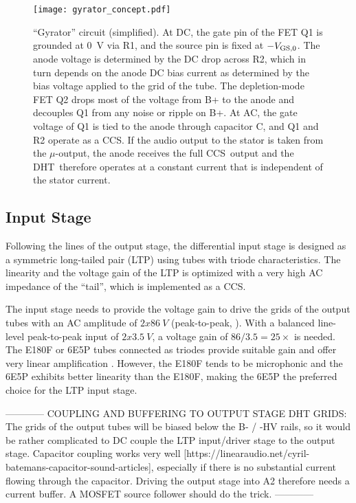 \begin{figure}
\begin{center}
\texttt{[image: gyrator\_concept.pdf]}
\caption{``Gyrator'' circuit (simplified). At DC, the gate pin of the FET Q1 is grounded at \SI{0}{V} via R1, and the source pin is fixed at $-V_{\rm GS,0}$. The anode voltage is determined by the DC drop across R2, which in turn depends on the anode DC bias current as determined by the bias voltage applied to the grid of the tube. The depletion-mode FET Q2 drops most of the voltage from B+ to the anode and decouples Q1 from any noise or ripple on B+. At AC, the gate voltage of Q1 is tied to the anode through capacitor C, and Q1 and R2 operate as a CCS. If the audio output to the stator is taken from the $\mu$-output, the anode receives the full CCS output and the DHT therefore operates at a constant current that is independent of the stator current.}
\end{center}
\end{figure}



\subsection{Input Stage}

Following the lines of the output stage, the differential input stage is designed as a symmetric long-tailed pair (LTP)\cite{valvewizard_LTP} using tubes with triode characteristics. The linearity and the voltage gain of the LTP is optimized with a very high AC impedance of the ``tail'', which is implemented as a CCS.

The input stage needs to provide the voltage gain to drive the grids of the output tubes with an AC amplitude of $2 x \SI{86}{V}$ (peak-to-peak, ). With a balanced line-level peak-to-peak input of $2 x \SI{3.5}{V}$, a voltage gain of $86 / 3.5 = 25\times$ is needed. The E180F or 6E5P tubes connected as triodes provide suitable gain and offer very linear amplification \cite{bartola_thdbenchmark,millett_pentodes,klausmobile_testerfiles}. However, the E180F tends to be microphonic\cite{osdeha_p23} and the 6E5P exhibits better linearity than the E180F\cite{osdeha_p32}, making the 6E5P the preferred choice for the LTP input stage.



------------
COUPLING AND BUFFERING TO OUTPUT STAGE DHT GRIDS: The grids of the output tubes will be biased below the B- / -HV rails, so it would be rather complicated to DC couple the LTP input/driver stage to the output stage. Capacitor coupling works very well [https://linearaudio.net/cyril-batemans-capacitor-sound-articles], especially if there is no substantial current flowing through the capacitor. Driving the output stage into A2 therefore needs a current buffer. A MOSFET source follower should do the trick.
------------


